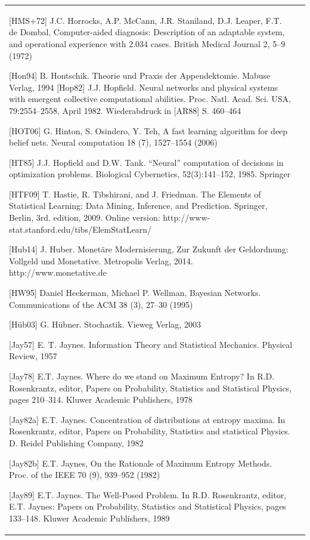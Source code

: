 \documentclass[10pt]{book}
\begin{document}
\begin{tabular}{|l|l|}
[HMS+72] J.C. Horrocks, A.P. McCann, J.R. Staniland, D.J. Leaper, F.T. de Dombal, Computer-aided diagnosis: Description of an adaptable system, and operational experience with 2.034 cases. British Medical Journal 2, 5–9 (1972)

[Hon94] B. Hontschik. Theorie und Praxis der Appendektomie. Mabuse Verlag, 1994
[Hop82] J.J. Hopfield. Neural networks and physical systems with emergent collective computational abilities. Proc. Natl. Acad. Sci. USA, 79:2554–2558, April 1982. Wiederabdruck in [AR88] S. 460–464

[HOT06] G. Hinton, S. Osindero, Y. Teh, A fast learning algorithm for deep belief nets. Neural computation 18 (7), 1527–1554 (2006)

[HT85] J.J. Hopfield and D.W. Tank. “Neural” computation of decisions in optimization problems. Biological Cybernetics, 52(3):141–152, 1985. Springer

[HTF09] T. Hastie, R. Tibshirani, and J. Friedman. The Elements of Statistical Learning: Data Mining, Inference, and Prediction. Springer, Berlin, 3rd. edition, 2009. Online version: http://www-stat.stanford.edu/tibs/ElemStatLearn/

[Hub14] J. Huber. Monetäre Modernisierung, Zur Zukunft der Geldordnung: Vollgeld und Monetative. Metropolis Verlag, 2014. http://www.monetative.de

[HW95] Daniel Heckerman, Michael P. Wellman, Bayesian Networks. Communications of the ACM 38 (3), 27–30 (1995)

[Hüb03] G. Hübner. Stochastik. Vieweg Verlag, 2003

[Jay57] E. T. Jaynes. Information Theory and Statistical Mechanics. Physical Review, 1957

[Jay78] E.T. Jaynes. Where do we stand on Maximum Entropy? In R.D. Rosenkrantz, editor, Papers on Probability, Statistics and Statistical Physics, pages 210–314. Kluwer Academic Publishers, 1978

[Jay82a] E.T. Jaynes. Concentration of distributions at entropy maxima. In Rosenkrantz, editor, Papers on Probability, Statistics and statistical Physics. D. Reidel Publishing Company, 1982

[Jay82b] E.T. Jaynes, On the Rationale of Maximum Entropy Methods. Proc. of the IEEE 70 (9), 939–952 (1982)

[Jay89] E.T. Jaynes. The Well-Posed Problem. In R.D. Rosenkrantz, editor, E.T. Jaynes: Papers on Probability, Statistics and Statistical Physics, pages 133–148. Kluwer Academic Publishers, 1989


\end{tabular}
\end{document}
